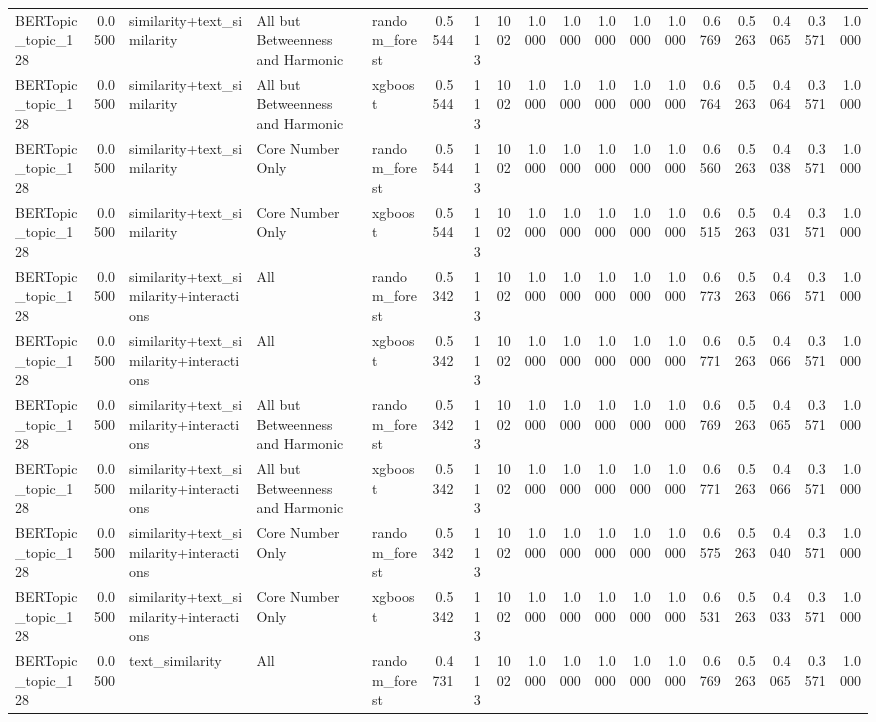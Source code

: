 \begin{tabular}{lrlllrrrrrrrrrrrrr}
BERTopic_topic_128 & 0.0500 & similarity+text_similarity & All but Betweenness and Harmonic & random_forest & 0.5544 & 113 & 1002 & 1.0000 & 1.0000 & 1.0000 & 1.0000 & 1.0000 & 0.6769 & 0.5263 & 0.4065 & 0.3571 & 1.0000 \\
BERTopic_topic_128 & 0.0500 & similarity+text_similarity & All but Betweenness and Harmonic & xgboost & 0.5544 & 113 & 1002 & 1.0000 & 1.0000 & 1.0000 & 1.0000 & 1.0000 & 0.6764 & 0.5263 & 0.4064 & 0.3571 & 1.0000 \\
BERTopic_topic_128 & 0.0500 & similarity+text_similarity & Core Number Only & random_forest & 0.5544 & 113 & 1002 & 1.0000 & 1.0000 & 1.0000 & 1.0000 & 1.0000 & 0.6560 & 0.5263 & 0.4038 & 0.3571 & 1.0000 \\
BERTopic_topic_128 & 0.0500 & similarity+text_similarity & Core Number Only & xgboost & 0.5544 & 113 & 1002 & 1.0000 & 1.0000 & 1.0000 & 1.0000 & 1.0000 & 0.6515 & 0.5263 & 0.4031 & 0.3571 & 1.0000 \\
BERTopic_topic_128 & 0.0500 & similarity+text_similarity+interactions & All & random_forest & 0.5342 & 113 & 1002 & 1.0000 & 1.0000 & 1.0000 & 1.0000 & 1.0000 & 0.6773 & 0.5263 & 0.4066 & 0.3571 & 1.0000 \\
BERTopic_topic_128 & 0.0500 & similarity+text_similarity+interactions & All & xgboost & 0.5342 & 113 & 1002 & 1.0000 & 1.0000 & 1.0000 & 1.0000 & 1.0000 & 0.6771 & 0.5263 & 0.4066 & 0.3571 & 1.0000 \\
BERTopic_topic_128 & 0.0500 & similarity+text_similarity+interactions & All but Betweenness and Harmonic & random_forest & 0.5342 & 113 & 1002 & 1.0000 & 1.0000 & 1.0000 & 1.0000 & 1.0000 & 0.6769 & 0.5263 & 0.4065 & 0.3571 & 1.0000 \\
BERTopic_topic_128 & 0.0500 & similarity+text_similarity+interactions & All but Betweenness and Harmonic & xgboost & 0.5342 & 113 & 1002 & 1.0000 & 1.0000 & 1.0000 & 1.0000 & 1.0000 & 0.6771 & 0.5263 & 0.4066 & 0.3571 & 1.0000 \\
BERTopic_topic_128 & 0.0500 & similarity+text_similarity+interactions & Core Number Only & random_forest & 0.5342 & 113 & 1002 & 1.0000 & 1.0000 & 1.0000 & 1.0000 & 1.0000 & 0.6575 & 0.5263 & 0.4040 & 0.3571 & 1.0000 \\
BERTopic_topic_128 & 0.0500 & similarity+text_similarity+interactions & Core Number Only & xgboost & 0.5342 & 113 & 1002 & 1.0000 & 1.0000 & 1.0000 & 1.0000 & 1.0000 & 0.6531 & 0.5263 & 0.4033 & 0.3571 & 1.0000 \\
BERTopic_topic_128 & 0.0500 & text_similarity & All & random_forest & 0.4731 & 113 & 1002 & 1.0000 & 1.0000 & 1.0000 & 1.0000 & 1.0000 & 0.6769 & 0.5263 & 0.4065 & 0.3571 & 1.0000 \\

\end{tabular}
